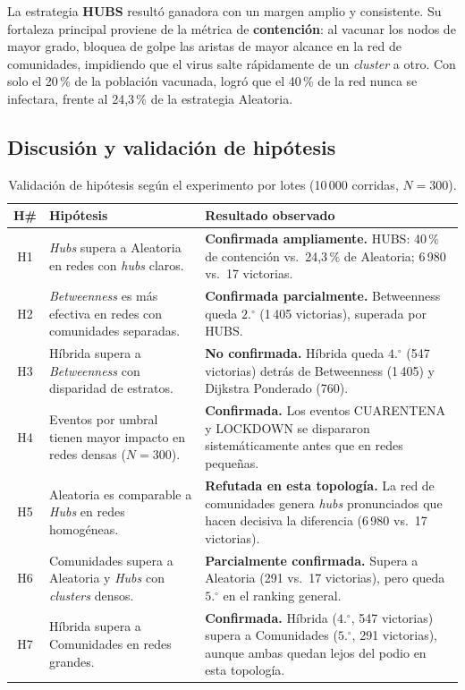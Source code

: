 \documentclass[spanish,notitlepage,letterpaper, 12pt]{article}
\begin{document}
La estrategia \textbf{HUBS} resultó ganadora con un margen amplio y consistente.
Su fortaleza principal proviene de la métrica de \textbf{contención}: al vacunar
los nodos de mayor grado, bloquea de golpe las aristas de mayor alcance en la red
de comunidades, impidiendo que el virus salte rápidamente de un \textit{cluster}
a otro. Con solo el 20\,\% de la población vacunada, logró que el 40\,\% de la
red nunca se infectara, frente al 24,3\,\% de la estrategia Aleatoria.

\subsection{Discusión y validación de hipótesis}

\begin{table}[H]
\centering
\footnotesize
\caption{Validación de hipótesis según el experimento por lotes (10\,000 corridas,
$N = 300$).}
\label{tab:validacion}
\begin{tabular}{c p{5.8cm} p{5.5cm}}
\toprule
\textbf{H\#} & \textbf{Hipótesis} & \textbf{Resultado observado} \\
\midrule
H1 & \textit{Hubs} supera a Aleatoria en redes con \textit{hubs} claros.
   & \textbf{Confirmada ampliamente.} HUBS: 40\,\% de contención vs.\ 24,3\,\%
     de Aleatoria; 6\,980 vs.\ 17 victorias. \\
\addlinespace
H2 & \textit{Betweenness} es más efectiva en redes con comunidades separadas.
   & \textbf{Confirmada parcialmente.} Betweenness queda $2.^{\circ}$ (1\,405
     victorias), superada por HUBS. \\
\addlinespace
H3 & Híbrida supera a \textit{Betweenness} con disparidad de estratos.
   & \textbf{No confirmada.} Híbrida queda $4.^{\circ}$ (547 victorias) detrás
     de Betweenness (1\,405) y Dijkstra Ponderado (760). \\
\addlinespace
H4 & Eventos por umbral tienen mayor impacto en redes densas ($N = 300$).
   & \textbf{Confirmada.} Los eventos CUARENTENA y LOCKDOWN se dispararon
     sistemáticamente antes que en redes pequeñas. \\
\addlinespace
H5 & Aleatoria es comparable a \textit{Hubs} en redes homogéneas.
   & \textbf{Refutada en esta topología.} La red de comunidades genera
     \textit{hubs} pronunciados que hacen decisiva la diferencia (6\,980 vs.\
     17 victorias). \\
\addlinespace
H6 & Comunidades supera a Aleatoria y \textit{Hubs} con \textit{clusters} densos.
   & \textbf{Parcialmente confirmada.} Supera a Aleatoria (291 vs.\ 17
     victorias), pero queda $5.^{\circ}$ en el ranking general. \\
\addlinespace
H7 & Híbrida supera a Comunidades en redes grandes.
   & \textbf{Confirmada.} Híbrida ($4.^{\circ}$, 547 victorias) supera a
     Comunidades ($5.^{\circ}$, 291 victorias), aunque ambas quedan lejos del
     podio en esta topología. \\
\bottomrule
\end{tabular}
\end{table}
\end{document}
